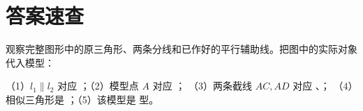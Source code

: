 \documentclass{exam-zh}
\newcounter{solstep}
\begin{document}
\clearpage
\section*{答案速查}




\begin{problem}[points=10]
  \noindent
  \begin{minipage}[t]{\dimexpr\linewidth-60mm-6mm\relax}
    \vspace{0pt}
    观察完整图形中的原三角形、两条分线和已作好的平行辅助线。把图中的实际对象代入模型：

（1）$l_1\parallel l_2$ 对应 \underline{\hspace{2cm}}；（2）模型点 $A$ 对应 \underline{\hspace{1cm}}；
（3）两条截线 $AC,AD$ 对应 \underline{\hspace{1.5cm}}、\underline{\hspace{1.5cm}}；
（4）相似三角形是 \underline{\hspace{4cm}}；（5）该模型是 \underline{\hspace{1.5cm}} 型。


  \end{minipage}\hfill
  \begin{diagramcoltikz}{60mm}{第 4 题图}
  }
  \end{diagramcoltikz}
  \par\medskip
  \answerarea[32mm]
  \setcounter{solstep}{0}
  \begin{solutionblock}
  \end{solutionblock}
\end{problem}
\end{document}

